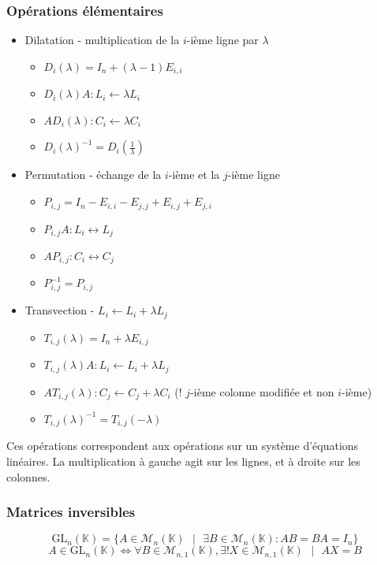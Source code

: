 \documentclass[openany]{book}
\begin{document}
\subsubsection{Opérations élémentaires}
\begin{itemize}
    \item Dilatation - multiplication de la $i$-ième ligne par $\lambda$
        \begin{itemize}
            \item $D_i(\lambda) = I_n + (\lambda-1)E_{i, i}$
            \item $D_i(\lambda)A : L_i \leftarrow \lambda L_i$
            \item $AD_i(\lambda) : C_i \leftarrow \lambda C_i$
            \item $D_i(\lambda)^{-1} = D_i(\frac{1}{\lambda})$
        \end{itemize}
    \item Permutation - échange de la $i$-ième et la $j$-ième ligne
        \begin{itemize}
            \item $P_{i, j} = I_n - E_{i, i} - E_{j, j} + E_{i, j} + E_{j, i}$
            \item $P_{i, j}A : L_i \leftrightarrow L_j$
            \item $AP_{i, j} : C_i \leftrightarrow C_j$
            \item $P_{i, j}^{-1} = P_{i, j}$
        \end{itemize}
    \item Transvection - $L_i \leftarrow L_i + \lambda L_j$
        \begin{itemize}
            \item $T_{i, j}(\lambda) = I_n + \lambda E_{i, j}$
            \item $T_{i, j}(\lambda)A : L_i \leftarrow L_i + \lambda L_j$
            \item $AT_{i, j}(\lambda) : C_j \leftarrow C_j + \lambda C_i$ (! $j$-ième colonne modifiée et non $i$-ième)
            \item $T_{i, j}(\lambda)^{-1} = T_{i, j}(-\lambda)$
        \end{itemize}
\end{itemize}

\noindent Ces opérations correspondent aux opérations sur un système d'équations linéaires. La multiplication à gauche agit sur les lignes, et à droite sur les colonnes. 

\subsubsection{Matrices inversibles}
\[ \text{GL}_n(\mathbb{K}) = \{ A \in \mathcal{M}_n(\mathbb{K}) \text{ } | \text{ } \exists B \in \mathcal{M}_n(\mathbb{K}) : AB = BA = I_n \} \]
\[ A \in \text{GL}_n(\mathbb{K}) \iff \forall B \in \mathcal{M}_{n, 1}(\mathbb{K}), \exists ! X \in \mathcal{M}_{n, 1}(\mathbb{K}) \text{ } | \text{ } AX = B \]
\end{document}
